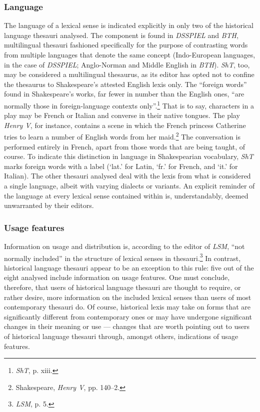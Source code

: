 \subsubsection{Language}
The language of a lexical sense is indicated explicitly in only two of the historical language thesauri analysed. The component is found in \textit{DSSPIEL} and \textit{BTH}, multilingual thesauri fashioned specifically for the purpose of contrasting words from multiple languages that denote the same concept (Indo-European languages, in the case of \textit{DSSPIEL}; Anglo-Norman and Middle English in \textit{BTH}). \textit{ShT}, too, may be considered a multilingual thesaurus, as its editor has opted not to confine the thesaurus to Shakespeare's attested English lexis only. The ``foreign words'' found in Shakespeare's works, far fewer in number than the English ones, ``are normally those in foreign-language contexts only''.\footnote{\textit{ShT}, p. xiii.} That is to say, characters in a play may be French or Italian and converse in their native tongues. The play \textit{Henry V}, for instance, contains a scene in which the French princess Catherine tries to learn a number of English words from her maid.\footnote{Shakespeare, \textit{Henry V}, %
pp. 140–2.} The conversation is performed entirely in French, apart from those words that are being taught, of course. To indicate this distinction in language in Shakespearian vocabulary, \textit{ShT} marks foreign words with a label (`lat.' for Latin, `fr.' for French, and `it.' for Italian). The other thesauri analysed deal with the lexis from what is considered a single language, albeit with varying dialects or variants. An explicit reminder of the language at every lexical sense contained within is, understandably, deemed unwarranted by their editors.

\subsubsection{Usage features}

Information on usage and distribution is, according to the editor of \textit{LSM}, ``not normally included'' in the structure of lexical senses in thesauri.\footnote{\textit{LSM}, p. 5.} In contrast, historical language thesauri appear to be an exception to this rule: five out of the eight analysed include information on usage features. One must conclude, therefore, that users of historical language thesauri are thought to require, or rather desire, more information on the included lexical senses than users of most contemporary thesauri do. Of course, historical lexis may take on forms that are significantly different from contemporary ones or may have undergone significant changes in their meaning or use --- changes that are worth pointing out to users of historical language thesauri through, amongst others, indications of usage features.

